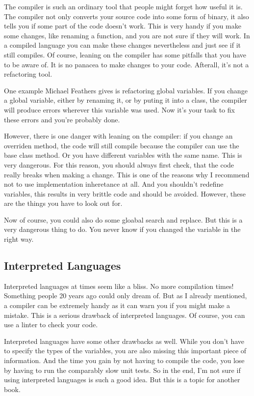 The compiler is such an ordinary tool that people might forget how useful it is. The compiler not only converts your source code into some form of binary, it also tells you if some part of the code doesn't work. This is very handy if you make some changes, like renaming a function, and you are not sure if they will work. In a compiled language you can make these changes nevertheless and just see if it still compiles. Of course, leaning on the compiler has some pitfalls that you have to be aware of. It is no panacea to make changes to your code. Afterall, it's not a refactoring tool.

One example Michael Feathers gives is refactoring global variables. If you change a global variable, either by renaming it, or by puting it into a class, the compiler will produce errors wherever this variable was used. Now it's your task to fix these errors and you're probably done.

However, there is one danger with leaning on the compiler: if you change an overriden method, the code will still compile because the compiler can use the base class method. Or you have different variables with the same name. This is very dangerous. For this reason, you should always first check, that the code really breaks when making a change. This is one of the reasons why I recommend not to use implementation inheretance at all. And you shouldn't redefine variables, this results in very brittle code and should be avoided. However, these are the things you have to look out for. 

Now of course, you could also do some gloabal search and replace. But this is a very dangerous thing to do. You never know if you changed the variable in the right way.


\subsection{Interpreted Languages}

Interpreted languages at times seem like a bliss. No more compilation times! Something people 20 years ago could only dream of. But as I already mentioned, a compiler can be extremely handy as it can warn you if you might make a mistake. This is a serious drawback of interpreted languages. Of course, you can use a linter to check your code.

Interpreted languages have some other drawbacks as well. While you don't have to specify the types of the variables, you are also missing this important piece of information. And the time you gain by not having to compile the code, you lose by having to run the comparably slow unit tests. So in the end, I'm not sure if using interpreted languages is such a good idea. But this is a topic for another book.


